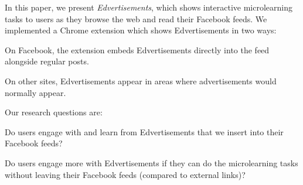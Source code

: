 \documentclass{sigchi}
\begin{document}
In this paper, we present \textit{Edvertisements}, which shows interactive microlearning tasks to users as they browse the web and read their Facebook feeds. We implemented a Chrome extension which shows Edvertisements in two ways:


\begin{compactitem}
\item On Facebook, the extension embeds Edvertisements directly into the feed alongside regular posts.
\item On other sites, Edvertisements appear in areas where advertisements would normally appear.
\end{compactitem}

\pagebreak

Our research questions are:

\begin{compactitem}
\item Do users engage with and learn from Edvertisements that we insert into their Facebook feeds?
\item Do users engage more with Edvertisements if they can do the microlearning tasks without leaving their Facebook feeds (compared to external links)?
\end{compactitem}
\end{document}
